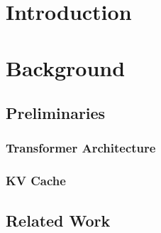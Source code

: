 \documentclass[12pt,twoside]{report}
\begin{document}



\clearpage{\pagestyle{empty}\cleardoublepage}
\setcounter{page}{1}
\pagestyle{fancy}

\begin{comment}
\begin{abstract}
Your abstract.
\end{abstract}
\end{comment}

\cleardoublepage
\begin{comment}
\section*{Acknowledgments}
Comment this out if not needed.

\end{comment}

\tableofcontents 


\setcounter{page}{1}
\fancyhead[LE,RO]{\slshape \rightmark}
\fancyhead[LO,RE]{\slshape \leftmark}

\chapter{Introduction} %

\chapter{Background} %
\section{Preliminaries}
\subsection{Transformer Architecture}
\subsection{KV Cache}

\section{Related Work}
\end{document}
